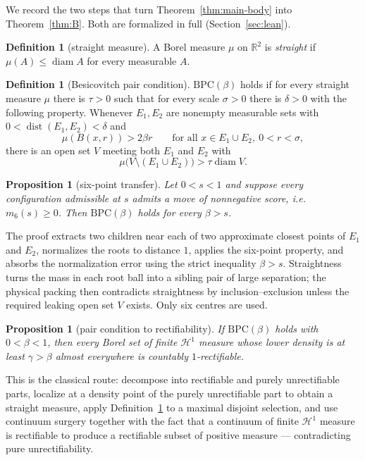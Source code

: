 \documentclass[11pt]{article}
\theoremstyle{plain}
\newtheorem{proposition}[theorem]{Proposition}
\theoremstyle{definition}
\newtheorem{definition}[theorem]{Definition}
\theoremstyle{remark}
\newcommand{\R}{\mathbb R}
\newcommand{\HH}{\mathcal H}
\newcommand{\diam}{\operatorname{diam}}
\newcommand{\dist}{\operatorname{dist}}
\begin{document}
We record the two steps that turn Theorem~\ref{thm:main-body} into
Theorem~\ref{thm:B}.  Both are formalized in full
(Section~\ref{sec:lean}).

\begin{definition}[straight measure]
A Borel measure $\mu$ on $\R^2$ is \emph{straight} if
$\mu(A)\le\diam A$ for every measurable $A$.
\end{definition}

\begin{definition}[Besicovitch pair condition]\label{def:bpc}
$\mathrm{BPC}(\beta)$ holds if for every straight measure $\mu$ there is
$\tau>0$ such that for every scale $\sigma>0$ there is $\delta>0$ with the
following property.  Whenever $E_1,E_2$ are nonempty measurable sets with
$0<\dist(E_1,E_2)<\delta$ and
\[
 \mu(B(x,r))>2\beta r\qquad\text{for all }x\in E_1\cup E_2,\ 0<r<\sigma,
\]
there is an open set $V$ meeting both $E_1$ and $E_2$ with
\[
 \mu\bigl(V\setminus(E_1\cup E_2)\bigr)>\tau\diam V .
\]
\end{definition}

\begin{proposition}[six-point transfer]\label{prop:transfer}
Let $0<s<1$ and suppose every configuration admissible at $s$ admits a move
of nonnegative score, i.e.\ $m_6(s)\ge0$.  Then $\mathrm{BPC}(\beta)$ holds
for every $\beta>s$.
\end{proposition}

The proof extracts two children near each of two approximate closest points
of $E_1$ and $E_2$, normalizes the roots to distance $1$, applies the
six-point property, and absorbs the normalization error using the strict
inequality $\beta>s$.  Straightness turns the mass in each root ball into a
sibling pair of large separation; the physical packing then contradicts
straightness by inclusion--exclusion unless the required leaking open set
$V$ exists.  Only six centres are used.

\begin{proposition}[pair condition to rectifiability]\label{prop:rect}
If $\mathrm{BPC}(\beta)$ holds with $0<\beta<1$, then every Borel set of
finite $\HH^1$ measure whose lower density is at least $\gamma>\beta$
almost everywhere is countably $1$-rectifiable.
\end{proposition}

This is the classical route: decompose into rectifiable and purely
unrectifiable parts, localize at a density point of the purely
unrectifiable part to obtain a straight measure, apply
Definition~\ref{def:bpc} to a maximal disjoint selection, and use continuum
surgery together with the fact that a continuum of finite $\HH^1$ measure
is rectifiable to produce a rectifiable subset of positive measure ---
contradicting pure unrectifiability.
\end{document}
